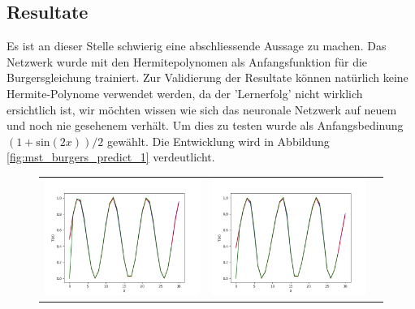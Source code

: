 \subsection{Resultate}

Es ist an dieser Stelle schwierig eine abschliessende Aussage zu machen. Das Netzwerk wurde mit den Hermitepolynomen als Anfangsfunktion für die Burgersgleichung trainiert. Zur Validierung der Resultate können natürlich keine Hermite-Polynome verwendet werden, da der 'Lernerfolg' nicht wirklich ersichtlich ist, wir möchten wissen wie sich das neuronale Netzwerk auf neuem und noch nie gesehenem verhält. Um dies zu testen wurde als Anfangsbedinung $(1 + \text{sin}(2x)) / 2$ gewählt. Die Entwicklung wird in Abbildung \ref{fig:mst_burgers_predict_1} verdeutlicht.

\begin{figure}
	\centering
	\begin{tabular}{ccc}
		\includegraphics[scale=0.27]{learning/img/burger_predict0.png} &
		\includegraphics[scale=0.27]{learning/img/burger_predict10.png} &

\end{tabular}
\end{figure}
